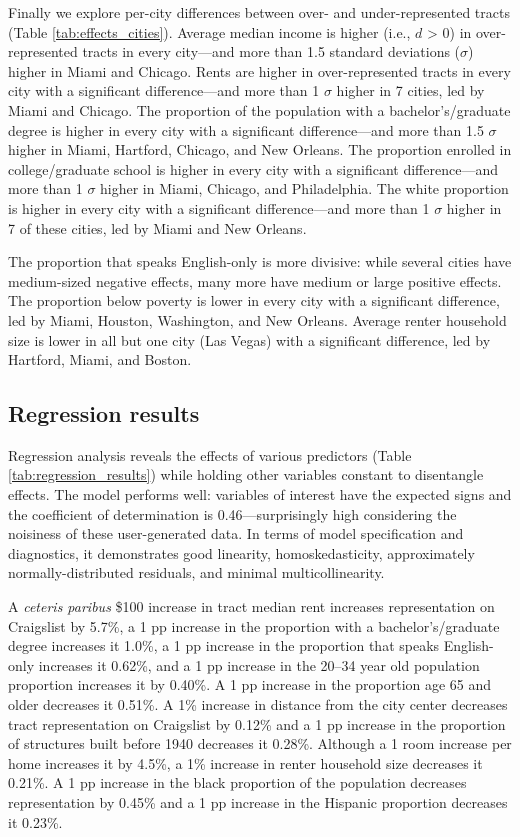\documentclass[11pt,onecolumn]{article} %
\begin{document}
Finally we explore per-city differences between over- and under-represented tracts (Table \ref{tab:effects_cities}). Average median income is higher (i.e., $d$ > 0) in over-represented tracts in every city---and more than 1.5 standard deviations ($\sigma$) higher in Miami and Chicago. Rents are higher in over-represented tracts in every city with a significant difference---and more than 1 $\sigma$ higher in 7 cities, led by Miami and Chicago. The proportion of the population with a bachelor's/graduate degree is higher in every city with a significant difference---and more than 1.5 $\sigma$ higher in Miami, Hartford, Chicago, and New Orleans. The proportion enrolled in college/graduate school is higher in every city with a significant difference---and more than 1 $\sigma$ higher in Miami, Chicago, and Philadelphia. The white proportion is higher in every city with a significant difference---and more than 1 $\sigma$ higher in 7 of these cities, led by Miami and New Orleans.

The proportion that speaks English-only is more divisive: while several cities have medium-sized negative effects, many more have medium or large positive effects. The proportion below poverty is lower in every city with a significant difference, led by Miami, Houston, Washington, and New Orleans. Average renter household size is lower in all but one city (Las Vegas) with a significant difference, led by Hartford, Miami, and Boston.

\subsection{Regression results}

Regression analysis reveals the effects of various predictors (Table \ref{tab:regression_results}) while holding other variables constant to disentangle effects. The model performs well: variables of interest have the expected signs and the coefficient of determination is 0.46---surprisingly high considering the noisiness of these user-generated data. In terms of model specification and diagnostics, it demonstrates good linearity, homoskedasticity, approximately normally-distributed residuals, and minimal multicollinearity.

A \textit{ceteris paribus} \$100 increase in tract median rent increases representation on Craigslist by 5.7\%, a 1 pp increase in the proportion with a bachelor's/graduate degree increases it 1.0\%, a 1 pp increase in the proportion that speaks English-only increases it 0.62\%, and a 1 pp increase in the 20--34 year old population proportion increases it by 0.40\%. A 1 pp increase in the proportion age 65 and older decreases it 0.51\%. A 1\% increase in distance from the city center decreases tract representation on Craigslist by 0.12\% and a 1 pp increase in the proportion of structures built before 1940 decreases it 0.28\%. Although a 1 room increase per home increases it by 4.5\%, a 1\% increase in renter household size decreases it 0.21\%. A 1 pp increase in the black proportion of the population decreases representation by 0.45\% and a 1 pp increase in the Hispanic proportion decreases it 0.23\%. 
\end{document}
